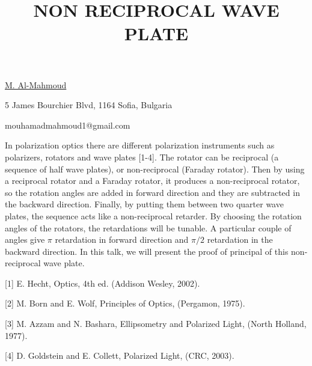 \title{NON RECIPROCAL WAVE PLATE}

\underline{M. Al-Mahmoud}  

{\normalsize{\vspace{-4mm}
5 James Bourchier Blvd, 
1164 Sofia, 
Bulgaria



\email mouhamadmahmoud1@gmail.com}}

In polarization optics there are different polarization instruments such as polarizers, rotators and wave plates [1-4]. The rotator can be reciprocal (a sequence of half wave plates), or non-reciprocal (Faraday rotator). Then by using a reciprocal rotator and a Faraday rotator, it produces a non-reciprocal rotator, so the rotation angles are added in forward direction and they are subtracted in the backward direction.
Finally, by putting them between two quarter wave plates, the sequence acts like a non-reciprocal retarder. By choosing the rotation angles of the rotators, the retardations will be tunable. A particular couple of angles give $\pi$ retardation in forward direction and $\pi/2$ retardation in the backward direction. 
In this talk, we will present the proof of principal of this non-reciprocal wave plate.

{\normalsize
[1] E. Hecht, Optics, 4th ed. (Addison Wesley, 2002).
\vsp

[2] M. Born and E. Wolf, Principles of Optics, (Pergamon, 1975).
\vsp

[3] M. Azzam and N. Bashara, Ellipsometry and Polarized Light, (North Holland, 1977).
\vsp

[4] D. Goldstein and E. Collett, Polarized Light, (CRC, 2003).
}

\vspace{\baselineskip}